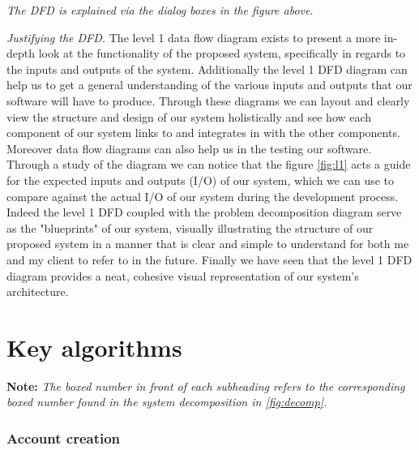 \textit{The DFD is explained via the dialog boxes in 
the figure above}.\\ \vspace{0.2cm}

\textit{Justifying the DFD.} The level 1 data flow diagram 
exists to present a more in-depth look at the functionality of
the proposed system, specifically in regards to the inputs and 
outputs of the system. Additionally the level 1 DFD diagram can help 
us to get a general understanding of the various inputs and 
outputs that our software will have to produce. Through these
diagrams we can layout and clearly view the structure and
design of our system holistically and see how each component
of our system links to and integrates in with the other components.
Moreover data flow diagrams can also help us in the testing our 
software. Through a study of the diagram we can notice that the
figure \ref{fig:l1} acts a guide for the expected inputs and
outputs (I/O) of our system, which we can use to compare against
the actual I/O of our system during the development process.
Indeed the level 1 DFD coupled with the problem decomposition 
diagram serve as the "blueprints" of our system, visually 
illustrating the structure of our proposed system in a manner 
that is clear and simple to understand for both me and my client 
to refer to in the future.
Finally we have seen that the level 1 DFD diagram provides a
neat, cohesive visual representation of our system's architecture.

\section{Key algorithms}
\label{sec:algos}



\textbf{Note:} \textit{The boxed number in front of each subheading refers 
to the corresponding boxed number found in the system 
decomposition in \ref{fig:decomp}.}

\subsubsection{ Account creation}

